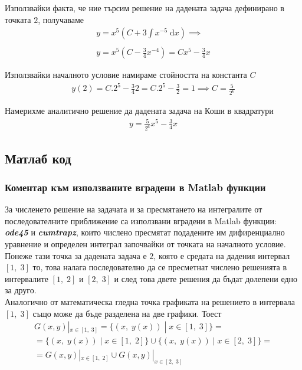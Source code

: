 \documentclass[a4paper, 12pt]{article}
\begin{document}
Използвайки факта, че ние търсим решение на дадената задача дефинирано в точката $2$,
получаваме
\begin{align*}
    y = x^5\left(C + 3\int x^{-5} \; {\mathrm d x}\right) \implies \\\\
    y = x^5(C - \frac{3}{4}x^{-4}) = Cx^5 - \frac{3}{4}x
\end{align*}

Използвайки началното условие намираме стойността на константа $C$
\begin{align*}
    y(2) = C.2^5 - \frac{3}{4}2 = C.2^5 - \frac{3}{2} = 1 \implies C = \frac{5}{2^6}
\end{align*}

Намерихме аналитично решение да дадената задача на Коши в квадратури
\begin{align*}
    y = \frac{5}{2^6}x^5 - \frac{3}{4}x
\end{align*}

\subsection{Матлаб код}



\subsubsection{Коментар към използваните вградени в Matlab функции}

За численето решение на задачата и за пресмятането на интегралите
от последователните приближение са използвани вградени в Matlab функции:
\textbf{\textit{ode45}} и \textbf{\textit{cumtrapz}}, които числено пресмятат
подадените им дифиренциално уравнение и определен интеграл започвайки
от точката на началното условие. Понеже тази точка за дадената задача
е $2$, която е средата на дадения интервал $[1, \; 3]$ то,
това налага последователно да се пресметнат числено
решенията в интервалите $[1, \; 2]$ и $[2, \; 3]$
и след това двете решения да бъдат долепени едно за друго. \\

Аналогично от математическа гледна точка графиката на решението в
интервала $[1, \; 3]$ също може да бъде разделена на две графики. Тоест
\begin{align*} 
    G(x, y)|_{x \in [1, \; 3]} = \{(x, \; y(x)) \; | \; x \in [1, \; 3]\} = \\
    = \{(x, \; y(x)) \; | \; x \in [1, \; 2]\} \cup \{(x, \; y(x)) \; | \; x \in [2, \; 3]\} = \\
    = G(x, y)|_{x \in [1, \; 2]} \cup G(x, y)|_{x \in [2, \; 3]}
\end{align*}
\end{document}
